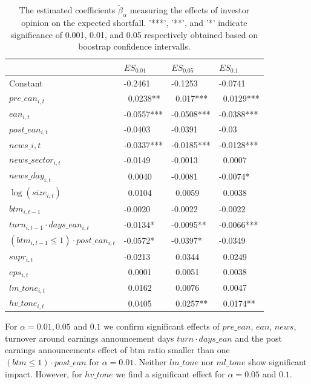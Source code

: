 \documentclass[]{article}
\begin{document}
\begin{table}[h!]

\caption{\label{tab:unnamed-chunk-22}The estimated coefficients $\tilde\beta_\alpha$ measuring the effects of investor opinion on the expected shortfall. '***', '**', and '*' indicate significance of 0.001, 0.01, and 0.05 respectively obtained based on boostrap confidence intervalls.}
\centering
\begin{tabular}[t]{l|l|l|l}
\hline
  & $ES_{0.01}$ & $ES_{0.05}$ & $ES_{0.1}$\\
\hline
Constant & -0.2461 & -0.1253 & -0.0741\\
\hline
$pre\_ean_{i,t}$& ~0.0238** & ~0.017*** & ~0.0129***\\
\hline
$ean_{i,t}$  & -0.0557*** & -0.0508*** & -0.0388***\\
\hline
$post\_ean_{i,t}$ & -0.0403 & -0.0391 & -0.03\\
\hline
$news\_{i,t}$ & -0.0337*** & -0.0185*** & -0.0128***\\
\hline
$news\_sector_{i,t}$  & -0.0149 & -0.0013 & ~0.0007\\
\hline
$news\_day_{i,t}$ & ~0.0040 & -0.0081 & -0.0074*\\
\hline
$\log(size_{i,t})$ & ~0.0104 & ~0.0059 & ~0.0038\\
\hline
$btm_{i,t-1}$  & -0.0020 & -0.0022 & -0.0022\\
\hline
$turn_{i,t-1}\cdot days\_ean_{i,t}$ & -0.0134* & -0.0095** & -0.0066***\\
\hline
$(btm_{i,t-1}\leq 1)\cdot post\_ean_{i,t}$ & -0.0572* & -0.0397* & -0.0349\\
\hline
$supr_{i,t}$& -0.0213 & ~0.0344 & ~0.0249\\
\hline
$eps_{i,t}$  & ~0.0001 & ~0.0051 & ~0.0038\\
\hline
$lm\_tone_{i,t}$& ~0.0162 & ~0.0076 & ~0.0047\\
\hline
$hv\_tone_{i,t}$& ~0.0405 & ~0.0257** & ~0.0174**\\
\hline
\end{tabular}
\end{table}

For \(\alpha = 0.01,0.05\) and \(0.1\) we confirm significant effects of \(pre\_ean\), \(ean\), \(news\), turnover around earnings announcement days \(turn\cdot days\_ean\) and the post earnings announcements effect of btm ratio smaller than one \((btm\leq 1)\cdot post\_ean\) for \(\alpha=0.01\). Neither \(lm\_tone\) nor \(ml\_tone\) show significant impact. However, for \(hv\_tone\) we find a significant effect for \(\alpha=0.05\) and \(0.1\).
\end{document}
